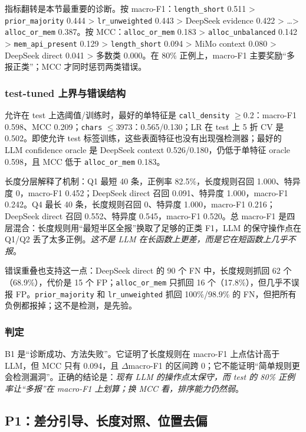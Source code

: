 \documentclass[conference]{IEEEtran}
\begin{document}
指标翻转是本节最重要的诊断。按 macro-F1：\texttt{length\_short} 0.511 > \texttt{prior\_majority} 0.444 > \texttt{lr\_unweighted} 0.443 > DeepSeek evidence 0.422 > \dots > \texttt{alloc\_or\_mem} 0.387。按 MCC：\texttt{alloc\_or\_mem} 0.183 > \texttt{alloc\_unbalanced} 0.142 > \texttt{mem\_api\_present} 0.129 > \texttt{length\_short} 0.094 > MiMo context 0.080 > DeepSeek direct 0.041 > 多数类 0.000。在 80\% 正例上，macro-F1 主要奖励“多报正类”；MCC 才同时惩罚两类错误。

\subsubsection{test-tuned 上界与错误结构}

允许在 test 上选阈值/训练时，最好的单特征是 \texttt{call\_density} $\ge$0.2：macro-F1 0.598、MCC 0.209；\texttt{chars} $\le$3973：0.565/0.130；LR 在 test 上 5 折 CV 是 0.502。即使允许 test 标签训练，这些表面特征也没有出现强检测器；最好的 LLM confidence oracle 是 DeepSeek context 0.526/0.180，仍低于单特征 oracle 0.598，且 MCC 低于 \texttt{alloc\_or\_mem} 0.183。

长度分层解释了机制：Q1 最短 40 条，正例率 82.5\%，长度规则召回 1.000、特异度 0，macro-F1 0.452；DeepSeek direct 召回 0.091、特异度 1.000，macro-F1 0.242。Q4 最长 40 条，长度规则召回 0、特异度 1.000，macro-F1 0.216；DeepSeek direct 召回 0.552、特异度 0.545，macro-F1 0.520。总 macro-F1 是四层混合：长度规则用“最短半区全报”换取了足够的正类 F1，LLM 的保守操作点在 Q1/Q2 丢了太多正例。\emph{这不是 LLM 在长函数上更差，而是它在短函数上几乎不报}。

错误重叠也支持这一点：DeepSeek direct 的 90 个 FN 中，长度规则抓回 62 个（68.9\%），代价是 15 个 FP；\texttt{alloc\_or\_mem} 只抓回 16 个（17.8\%），但几乎不误报 FP。\texttt{prior\_majority} 和 \texttt{lr\_unweighted} 抓回 100\%/98.9\% 的 FN，但把所有负例都报掉；这不是检测，是先验。

\subsubsection{判定}

B1 是“诊断成功、方法失败”。它证明了长度规则在 macro-F1 上点估计高于 LLM，但 MCC 只有 0.094，且 $\Delta$macro-F1 的区间跨 0；它不能证明“简单规则更会检测漏洞”。正确的结论是：\emph{现有 LLM 的操作点太保守，而 test 的 80\% 正例率让“多报”在 macro-F1 上划算；换 MCC 看，排序能力仍然弱}。

\subsection{P1：差分引导、长度对照、位置去偏}
\label{sec:p1}
\end{document}
